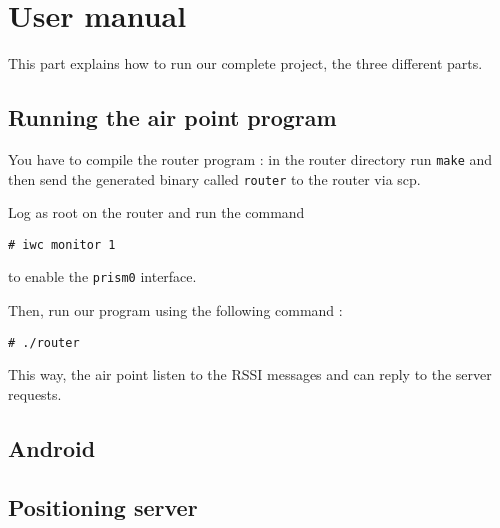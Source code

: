 \section{User manual}

This part explains how to run our complete project, the three different parts.

\subsection{Running the air point program}

You have to compile the router program : in the router directory run \verb+make+
and then send the generated binary called \verb+router+ to the router via scp.

Log as root on the router and run the command 

\verb+# iwc monitor 1+

to enable the \verb+prism0+ interface.

Then, run our program using the following command :

\verb+# ./router+

This way, the air point listen to the RSSI messages and can reply to the server
requests.

\subsection{Android}


\subsection{Positioning server}


